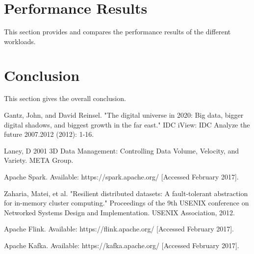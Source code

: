 \documentclass[]{article}
\begin{document}
\section{Performance Results}

This section provides and compares the performance results of the different workloads.

\section{Conclusion}
This section gives the overall conclusion.


\begin{thebibliography}{[MT1]}
%
Gantz, John, and David Reinsel. "The digital universe in 2020: Big data, bigger digital shadows, and biggest growth in the far east." IDC iView: IDC Analyze the future 2007.2012 (2012): 1-16.

Laney, D 2001 3D Data Management: Controlling Data Volume, Velocity, and Variety. META Group.

Apache Spark. Available: https://spark.apache.org/ [Accessed February 2017].

Zaharia, Matei, et al. "Resilient distributed datasets: A fault-tolerant abstraction for in-memory cluster computing." Proceedings of the 9th USENIX conference on Networked Systems Design and Implementation. USENIX Association, 2012.

Apache Flink. Available: https://flink.apache.org/ [Accessed February 2017].

Apache Kafka. Available: https://kafka.apache.org/ [Accessed February 2017].


%
\end{thebibliography}
\end{document}
